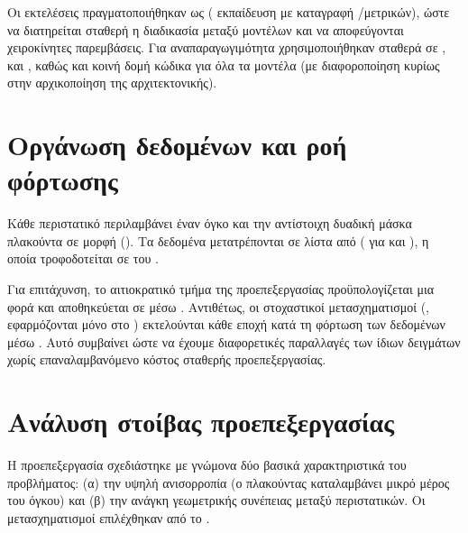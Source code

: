 Οι εκτελέσεις πραγματοποιήθηκαν ως \emph{} (
εκπαίδευση με καταγραφή /μετρικών), ώστε να διατηρείται σταθερή
η διαδικασία μεταξύ μοντέλων και να αποφεύγονται χειροκίνητες παρεμβάσεις.
Για αναπαραγωγιμότητα χρησιμοποιήθηκαν σταθερά  σε ,
 και , καθώς και κοινή δομή κώδικα για όλα τα μοντέλα
(με διαφοροποίηση κυρίως στην αρχικοποίηση της αρχιτεκτονικής).

\section{Οργάνωση δεδομένων και ροή φόρτωσης}
\label{sec:proto_dataflow}
Κάθε περιστατικό περιλαμβάνει έναν  όγκο και την αντίστοιχη
δυαδική μάσκα πλακούντα σε μορφή  (). Τα
δεδομένα μετατρέπονται σε λίστα από  ( για
 και ), η οποία τροφοδοτείται σε
 του .

Για επιτάχυνση, το αιτιοκρατικό τμήμα της προεπεξεργασίας προϋπολογίζεται μια φορά και αποθηκεύεται σε  μέσω \textbf{}.
Αντιθέτως, οι στοχαστικοί μετασχηματισμοί (, εφαρμόζονται μόνο στο ) εκτελούνται κάθε εποχή κατά τη φόρτωση των δεδομένων μέσω . 
Αυτό συμβαίνει ώστε να έχουμε διαφορετικές παραλλαγές των ίδιων δειγμάτων χωρίς επαναλαμβανόμενο κόστος σταθερής προεπεξεργασίας.

\section{Ανάλυση στοίβας προεπεξεργασίας}
\label{sec:proto_preproc}

Η προεπεξεργασία σχεδιάστηκε με γνώμονα δύο βασικά χαρακτηριστικά του
προβλήματος: (α) την υψηλή ανισορροπία 
(ο πλακούντας καταλαμβάνει μικρό μέρος του όγκου) και (β) την ανάγκη
γεωμετρικής συνέπειας μεταξύ περιστατικών. Οι μετασχηματισμοί επιλέχθηκαν
από το  \cite{monaitransforms}.

